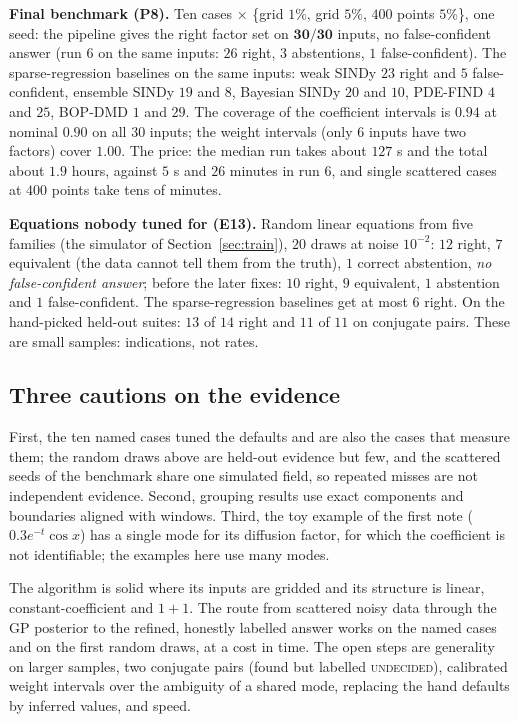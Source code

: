 \documentclass[11pt,a4paper]{article}
\theoremstyle{definition}
\begin{document}
\textbf{Final benchmark (P8).} Ten cases $\times$ \{grid $1\%$, grid $5\%$, $400$ points $5\%$\}, one seed: the pipeline gives the right factor set on $\mathbf{30/30}$ inputs, no false-confident answer (run 6 on the same inputs: $26$ right, $3$ abstentions, $1$ false-confident). The sparse-regression baselines on the same inputs: weak SINDy $23$ right and $5$ false-confident, ensemble SINDy $19$ and $8$, Bayesian SINDy $20$ and $10$, PDE-FIND $4$ and $25$, BOP-DMD $1$ and $29$. The coverage of the coefficient intervals is $0.94$ at nominal $0.90$ on all $30$ inputs; the weight intervals (only $6$ inputs have two factors) cover $1.00$. The price: the median run takes about $127$ s and the total about $1.9$ hours, against $5$ s and $26$ minutes in run 6, and single scattered cases at $400$ points take tens of minutes.

\textbf{Equations nobody tuned for (E13).} Random linear equations from five families (the simulator of Section~\ref{sec:train}), $20$ draws at noise $10^{-2}$: $12$ right, $7$ equivalent (the data cannot tell them from the truth), $1$ correct abstention, \emph{no false-confident answer}; before the later fixes: $10$ right, $9$ equivalent, $1$ abstention and $1$ false-confident. The sparse-regression baselines get at most $6$ right. On the hand-picked held-out suites: $13$ of $14$ right and $11$ of $11$ on conjugate pairs. These are small samples: indications, not rates.

\subsection{Three cautions on the evidence}
First, the ten named cases tuned the defaults and are also the cases that measure them; the random draws above are held-out evidence but few, and the scattered seeds of the benchmark share one simulated field, so repeated misses are not independent evidence. Second, grouping results use exact components and boundaries aligned with windows. Third, the toy example of the first note ($0.3e^{-t}\cos x$) has a single mode for its diffusion factor, for which the coefficient is not identifiable; the examples here use many modes.

\begin{keypoint}
The algorithm is solid where its inputs are gridded and its structure is linear, constant-coefficient and $1+1$. The route from scattered noisy data through the GP posterior to the refined, honestly labelled answer works on the named cases and on the first random draws, at a cost in time. The open steps are generality on larger samples, two conjugate pairs (found but labelled \textsc{undecided}), calibrated weight intervals over the ambiguity of a shared mode, replacing the hand defaults by inferred values, and speed.
\end{keypoint}
\end{document}

